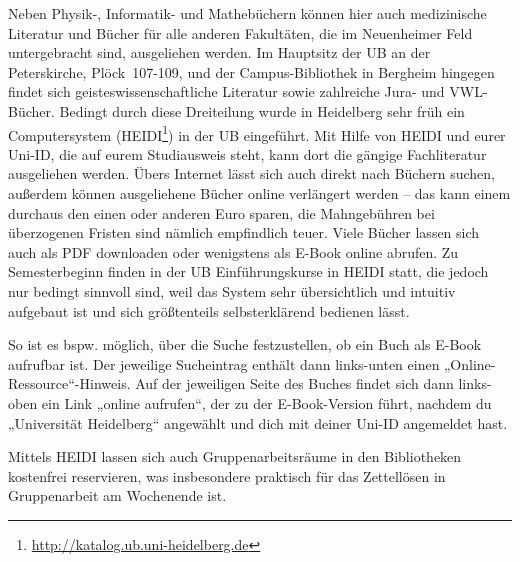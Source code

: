 Neben Physik-, Informatik- und Mathebüchern können hier auch medizinische Literatur und Bücher für alle anderen Fakultäten, die im Neuenheimer Feld untergebracht sind, ausgeliehen werden. Im Hauptsitz der \gls{UB} an der Peterskirche, Plöck~107-109, und der Campus-Bibliothek in Bergheim hingegen findet sich geisteswissenschaftliche Literatur sowie zahlreiche Jura- und VWL- Bücher. Bedingt durch diese Dreiteilung wurde in Heidelberg sehr früh ein Computersystem (\gls{HEIDI}\footnote{\url{http://katalog.ub.uni-heidelberg.de}}) in der UB eingeführt. Mit Hilfe von HEIDI und eurer Uni-ID, die auf eurem Studiausweis steht, kann dort die gängige Fachliteratur ausgeliehen werden. Übers Internet lässt sich auch direkt nach Büchern suchen, außerdem können ausgeliehene Bücher online verlängert werden -- das kann einem durchaus den einen oder anderen Euro sparen, die Mahngebühren bei überzogenen Fristen sind nämlich empfindlich teuer. Viele Bücher lassen sich auch als PDF downloaden oder wenigstens als E-Book online abrufen. Zu Semesterbeginn finden in der UB Einführungskurse in HEIDI statt, die jedoch nur bedingt sinnvoll sind, weil das System sehr übersichtlich und intuitiv aufgebaut ist und sich größtenteils selbsterklärend bedienen lässt.

So ist es bspw. möglich, über die Suche festzustellen, ob ein Buch als E-Book aufrufbar ist. Der jeweilige Sucheintrag enthält dann links-unten einen „Online-Ressource“-Hinweis. Auf der jeweiligen Seite des Buches findet sich dann links-oben ein Link „online aufrufen“, der zu der E-Book-Version führt, nachdem du „Universität Heidelberg“ angewählt und dich mit deiner Uni-ID angemeldet hast. 

Mittels HEIDI lassen sich auch Gruppenarbeitsräume in den Bibliotheken kostenfrei reservieren, was insbesondere praktisch für das Zettellösen in Gruppenarbeit am Wochenende ist.

